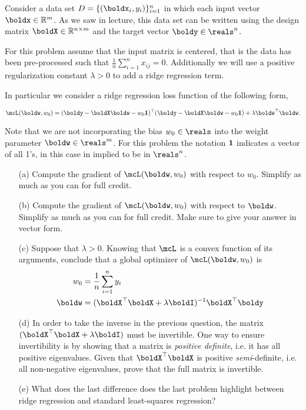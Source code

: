 \documentclass[submit]{harvardml}
\begin{document}
\begin{problem}

  Consider a data set $D = \{(\boldx_i, y_i)\}_{i=1}^n$ in which each
  input vector $\boldx \in \mathbb{R}^m$. As we saw in lecture, this
  data set can be written using the design matrix $\boldX \in
  \mathbb{R}^{n \times m}$ and the target vector $\boldy \in \reals^n$.
  
  
  For this problem assume that the input matrix is centered, that is
  the data has been pre-processed such that $\frac{1}{n} \sum_{i=1}^n
  x_{ij} = 0 $.  Additionally we will use a positive regularization
  constant $\lambda > 0$ to add a ridge regression term.

  In particular we consider a ridge regression loss function of the following form,

\[\mcL(\boldw, w_0) = (\boldy - \boldX \boldw - w_0 {\bf 1 })^\top (\boldy - \boldX
\boldw - w_0 {\bf 1 }) + \lambda \boldw^\top \boldw .\]

 Note that we are not incorporating the bias $w_0\in \reals$ into the weight parameter $\boldw \in \reals^m$.
 For this problem the notation ${\bf 1}$ indicates a vector of all 1's, in this case in implied to be in $\reals^n$.  


\begin{itemize}
  \item[(a)] Compute the gradient of $\mcL(\boldw, w_0)$ with respect to $w_0$.
    Simplify as much as you can for full credit.
  \item[(b)] Compute the gradient of $\mcL(\boldw, w_0)$ with respect to $\boldw$.
    Simplify as much as you can for full credit. Make sure to give your answer
    in vector form.
  \item[(c)] Suppose that $\lambda > 0$. Knowing that $\mcL$ is a convex function
    of its arguments, conclude that a global optimizer of
    $\mcL(\boldw, w_0)$ is
    \begin{align}
      w_0 &= \frac{1}{n} \sum_{i=1}^n y_i \\
      \boldw &= (\boldX^\top \boldX + \lambda \boldI)^{-1} \boldX^\top \boldy
    \end{align}
  \item[(d)] In order to take the inverse in the previous question, the
    matrix $(\boldX^\top \boldX + \lambda \boldI)$ must be invertible.
    One way to ensure invertibility is by showing that a matrix is
    \textit{positive definite}, i.e. it has all positive
    eigenvalues. Given that $\boldX^\top\boldX$ is positive
    \textit{semi}-definite, i.e.  all non-negative eigenvalues, prove that the
    full matrix is invertible.

  \item[(e)] What does the last difference does the last problem  highlight between ridge regression
    and standard least-squares regression?
    

\end{itemize}
\end{problem}
\end{document}
